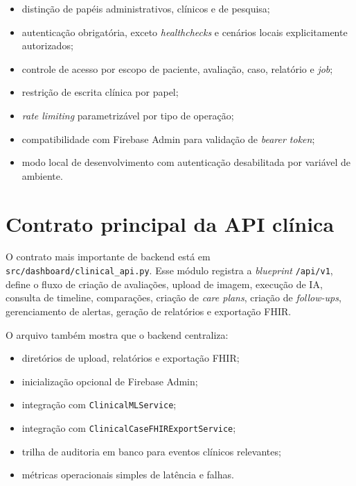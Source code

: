 \documentclass[
    12pt,
    openright,
    oneside,
    a4paper,
    chapter=TITLE,
    section=TITLE,
    brazil,
    sumario=tradicional,
    hidelinks
]{abntex2}
\begin{document}
\begin{itemize}
    \item distin\c{c}\~ao de pap\'eis administrativos, cl\'inicos e de pesquisa;
    \item autentica\c{c}\~ao obrigat\'oria, exceto \textit{healthchecks} e cen\'arios locais explicitamente autorizados;
    \item controle de acesso por escopo de paciente, avalia\c{c}\~ao, caso, relat\'orio e \textit{job};
    \item restri\c{c}\~ao de escrita cl\'inica por papel;
    \item \textit{rate limiting} parametriz\'avel por tipo de opera\c{c}\~ao;
    \item compatibilidade com Firebase Admin para valida\c{c}\~ao de \textit{bearer token};
    \item modo local de desenvolvimento com autentica\c{c}\~ao desabilitada por vari\'avel de ambiente.
\end{itemize}

\section{Contrato principal da API cl\'inica}

O contrato mais importante de backend est\'a em \texttt{src/dashboard/clinical\_api.py}. Esse m\'odulo registra a \textit{blueprint} \texttt{/api/v1}, define o fluxo de cria\c{c}\~ao de avalia\c{c}\~oes, upload de imagem, execu\c{c}\~ao de IA, consulta de timeline, compara\c{c}\~oes, cria\c{c}\~ao de \textit{care plans}, cria\c{c}\~ao de \textit{follow-ups}, gerenciamento de alertas, gera\c{c}\~ao de relat\'orios e exporta\c{c}\~ao FHIR.

O arquivo tamb\'em mostra que o backend centraliza:

\begin{itemize}
    \item diret\'orios de upload, relat\'orios e exporta\c{c}\~ao FHIR;
    \item inicializa\c{c}\~ao opcional de Firebase Admin;
    \item integra\c{c}\~ao com \texttt{ClinicalMLService};
    \item integra\c{c}\~ao com \texttt{ClinicalCaseFHIRExportService};
    \item trilha de auditoria em banco para eventos cl\'inicos relevantes;
    \item m\'etricas operacionais simples de lat\^encia e falhas.
\end{itemize}
\end{document}
